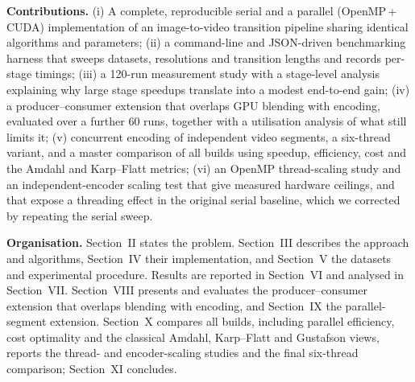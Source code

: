 \documentclass[conference]{IEEEtran}
\begin{document}
\textbf{Contributions.} (i) A complete, reproducible serial and a parallel (OpenMP\,+\,CUDA) implementation of an image-to-video transition pipeline sharing identical algorithms and parameters; (ii) a command-line and JSON-driven benchmarking harness that sweeps datasets, resolutions and transition lengths and records per-stage timings; (iii) a 120-run measurement study with a stage-level analysis explaining why large stage speedups translate into a modest end-to-end gain; (iv) a producer--consumer extension that overlaps GPU blending with encoding, evaluated over a further 60 runs, together with a utilisation analysis of what still limits it; (v) concurrent encoding of independent video segments, a six-thread variant, and a master comparison of all builds using speedup, efficiency, cost and the Amdahl and Karp--Flatt metrics; (vi) an OpenMP thread-scaling study and an independent-encoder scaling test that give measured hardware ceilings, and that expose a threading effect in the original serial baseline, which we corrected by repeating the serial sweep.

\textbf{Organisation.} Section~II states the problem. Section~III describes the approach and algorithms, Section~IV their implementation, and Section~V the datasets and experimental procedure. Results are reported in Section~VI and analysed in Section~VII. Section~VIII presents and evaluates the producer--consumer extension that overlaps blending with encoding, and Section~IX the parallel-segment extension. Section~X compares all builds, including parallel efficiency, cost optimality and the classical Amdahl, Karp--Flatt and Gustafson views, reports the thread- and encoder-scaling studies and the final six-thread comparison; Section~XI concludes.

\end{document}
